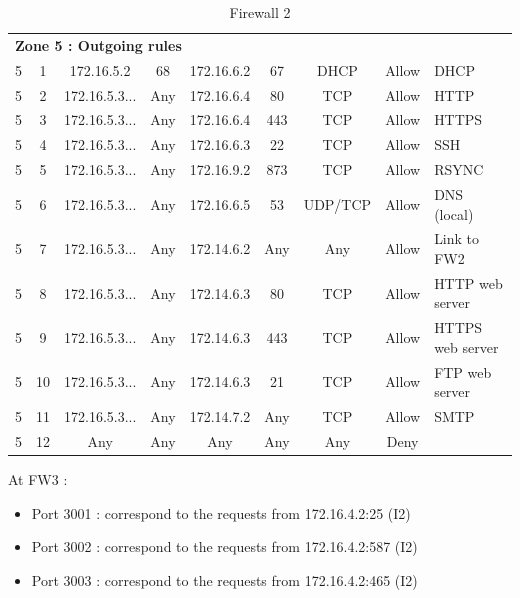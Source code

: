 \documentclass[a4paper,titlepage]{article}
\begin{document}
\begin{table}[h]
\begin{tabular}{c|c|cc|cc|ccl}
		\hline
		\multicolumn{9}{l}{\textbf{Zone 5 : Outgoing rules}}\\
		5 & 1 & 172.16.5.2 & 68 & 172.16.6.2 & 67 & DHCP & Allow & DHCP\\
		5 & 2 & 172.16.5.3... & Any & 172.16.6.4 & 80 & TCP & Allow & HTTP \\
		5 & 3 & 172.16.5.3... & Any & 172.16.6.4 & 443 & TCP & Allow & HTTPS \\
		5 & 4 & 172.16.5.3... & Any & 172.16.6.3 & 22 & TCP & Allow & SSH \\
		5 & 5 & 172.16.5.3... & Any & 172.16.9.2 & 873 & TCP & Allow & RSYNC \\
		5 & 6 & 172.16.5.3... & Any & 172.16.6.5 & 53 & UDP/TCP & Allow & DNS (local) \\
		5 & 7 & 172.16.5.3... & Any & 172.14.6.2 & Any & Any & Allow & Link to FW2 \\
		5 & 8 & 172.16.5.3... & Any & 172.14.6.3 & 80 & TCP & Allow & HTTP web server \\
		5 & 9 & 172.16.5.3... & Any & 172.14.6.3 & 443 & TCP & Allow & HTTPS web server \\
		5 & 10 & 172.16.5.3... & Any & 172.14.6.3 & 21 & TCP & Allow & FTP web server \\
		5 & 11 & 172.16.5.3... & Any & 172.14.7.2 & Any & TCP & Allow & SMTP \\

		5 & 12 & Any & Any & Any & Any & Any & Deny & \\


	\end{tabular}
	\caption{Firewall 2}
\end{table}



At FW3 :
\begin{itemize}
	\item Port 3001 : correspond to the requests from 172.16.4.2:25 (I2)
	\item Port 3002 : correspond to the requests from 172.16.4.2:587 (I2)
	\item Port 3003 : correspond to the requests from 172.16.4.2:465 (I2)
\end{itemize}
\end{document}

